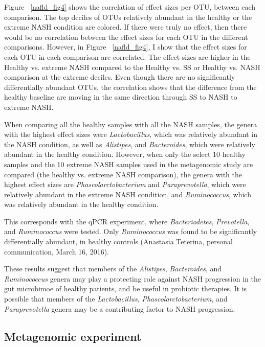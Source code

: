 \FloatBarrier

Figure ~\ref{nafld_fig4} shows the correlation of effect sizes per OTU, between each comparison. The top deciles of OTUs relatively abundant in the healthy or the extreme NASH condition are colored. If there were truly no effect, then there would be no correlation between the effect sizes for each OTU in the different comparisons. However, in Figure ~\ref{nafld_fig4}, I show that the effect sizes for each OTU in each comparison are correlated. The effect sizes are higher in the Healthy vs. extreme NASH compared to the Healthy vs. SS or Healthy vs. NASH comparison at the extreme deciles. Even though there are no significantly differentially abundant OTUs, the correlation shows that the difference from the healthy baseline are moving in the same direction through SS to NASH to extreme NASH.

When comparing all the healthy samples with all the NASH samples, the genera with the highest effect sizes were \textit{Lactobacillus}, which was relatively abundant in the NASH condition, as well as \textit{Alistipes}, and \textit{Bacteroides}, which were relatively abundant in the healthy condition. However, when only the select 10 healthy samples and the 10 extreme NASH samples used in the metagenomic study are compared (the healthy vs. extreme NASH comparison), the genera with the highest effect sizes are \textit{Phascolarctobacterium} and \textit{Paraprevotella}, which were relatively abundant in the extreme NASH condition, and \textit{Ruminococcus}, which was relatively abundant in the healthy condition.

This corresponds with the qPCR experiment, where \textit{Bacteriodetes}, \textit{Prevotella}, and \textit{Ruminococcus} were tested. Only \textit{Ruminococcus} was found to be significantly differentially abundant, in healthy controls (Anastasia Teterina, personal communication, March 16, 2016).

These results suggest that members of the \textit{Alistipes}, \textit{Bacteroides}, and \textit{Ruminococcus} genera may play a protecting role against NASH progression in the gut microbimoe of healthy patients, and be useful in probiotic therapies. It is possible that members of the \textit{Lactobacillus}, \textit{Phascolarctobacterium}, and \textit{Paraprevotella} genera may be a contributing factor to NASH progression.

\FloatBarrier

\subsection{Metagenomic experiment}

